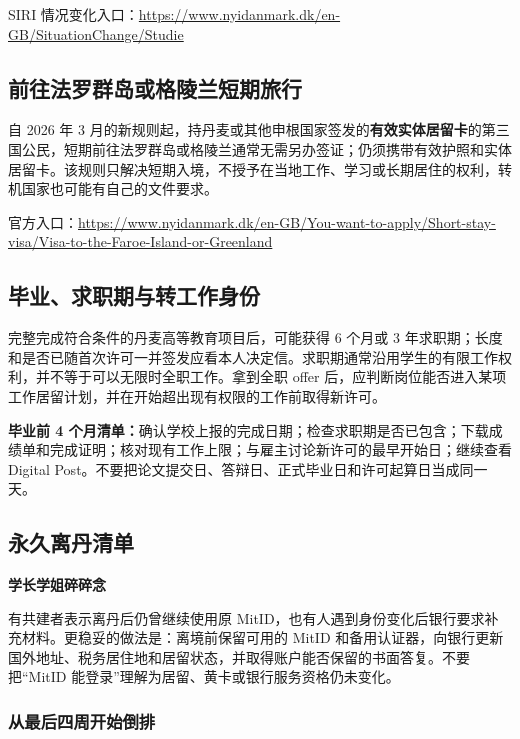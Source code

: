 SIRI 情况变化入口：\url{https://www.nyidanmark.dk/en-GB/SituationChange/Studie}

\subsection{前往法罗群岛或格陵兰短期旅行}

自 2026 年 3 月的新规则起，持丹麦或其他申根国家签发的\textbf{有效实体居留卡}的第三国公民，短期前往法罗群岛或格陵兰通常无需另办签证；仍须携带有效护照和实体居留卡。该规则只解决短期入境，不授予在当地工作、学习或长期居住的权利，转机国家也可能有自己的文件要求。

官方入口：\url{https://www.nyidanmark.dk/en-GB/You-want-to-apply/Short-stay-visa/Visa-to-the-Faroe-Island-or-Greenland}

\subsection{毕业、求职期与转工作身份}

完整完成符合条件的丹麦高等教育项目后，可能获得 6 个月或 3 年求职期；长度和是否已随首次许可一并签发应看本人决定信。求职期通常沿用学生的有限工作权利，并不等于可以无限时全职工作。拿到全职 offer 后，应判断岗位能否进入某项工作居留计划，并在开始超出现有权限的工作前取得新许可。

\begin{grayleftbox}
\textbf{毕业前 4 个月清单：}确认学校上报的完成日期；检查求职期是否已包含；下载成绩单和完成证明；核对现有工作上限；与雇主讨论新许可的最早开始日；继续查看 Digital Post。不要把论文提交日、答辩日、正式毕业日和许可起算日当成同一天。
\end{grayleftbox}

\subsection{永久离丹清单}

\begin{grayleftbox}\textbf{学长学姐碎碎念}
\experiencenotice

有共建者表示离丹后仍曾继续使用原 MitID，也有人遇到身份变化后银行要求补充材料。更稳妥的做法是：离境前保留可用的 MitID 和备用认证器，向银行更新国外地址、税务居住地和居留状态，并取得账户能否保留的书面答复。不要把“MitID 能登录”理解为居留、黄卡或银行服务资格仍未变化。
\end{grayleftbox}

\subsubsection*{从最后四周开始倒排}

